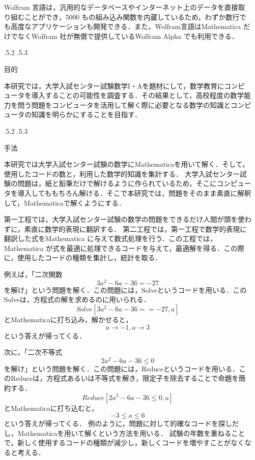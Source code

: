 \documentclass[uplatex,twocolumn]{jsarticle}
\makeatletter
\renewcommand{\section}{%
    \if@slide\clearpage\fi
    \@startsection{section}{1}{\z@}%
    {\Cvs \@plus.5\Cdp \@minus.2\Cdp}%
    {.5\Cvs \@plus.3\Cdp}%
    {\normalfont\raggedright}}
\makeatother
\begin{document}
Wolfram 言語は，汎用的なデータベースやインターネット上のデータを直接取り組むことができ，5000 もの組み込み関数を内蔵しているため，わずか数行でも高度なアプリケーションも開発できる．また，Wolfram言語はMathematica だけでなくWolfram 社が無償で提供しているWolfram Alpha でも利用できる\cite{mitubisi}．



\section{目的}

本研究では，大学入試センター試験数学I・Aを題材にして，数学教育にコンピュータを導入することの可能性を調査する．その結果として，高校程度の数学能力を問う問題をコンピュータを活用して解く際に必要となる数学の知識とコンピュータの知識を明らかにすることを目指す．





\section{手法}


 
本研究では大学入試センター試験の数学にMathematicaを用いて解く．そして，使用したコードの数と，利用した数学的知識を集計する．
大学入試センター試験の問題は，紙と鉛筆だけで解けるように作られているため，そこにコンピュータを導入してももちろん解ける．そこで本研究では，問題をそのまま素直に解釈して，Mathematicaで解くようにする．

第一工程では，大学入試センター試験の数学の問題をできるだけ人間が頭を使わずに，素直に数学的表現に翻訳する．
第二工程では，第一工程で数学的表現に翻訳した式をMathematica に与えて数式処理を行う．この工程では，Mathematica が式を最適に処理できるコードを与えて，最適解を得る．この際に，使用したコードの種類を集計し，統計を取る．

例えば，「二次関数\[3a^2 -6a-36=-27\]を解け」という問題を解く．この問題には，Solveというコードを用いる．このSolveは，方程式の解を求めるのに用いられる．\[Solve[3a^2 -6a-36==-27,a]\]とMathematicaに打ち込み，解かせると，\[{{a \rightarrow -1},{a \rightarrow 3}}\]という答えが帰ってくる．

次に，「二次不等式\[2a^2 -6a-36 \le 0\]を解け」という問題を解く．この問題には，Reduceというコードを用いる．このReduceは，方程式あるいは不等式を解き，限定子を除去することで命題を簡約する．\[Reduce[2a^2 -6a-36 \le 0,a]\]とMathematicaに打ち込むと，\[-3 \le a \le 6\]という答えが帰ってくる．
例のように，問題に対して的確なコードを探しだし，Mathematicaを用いて解くという方法を用いる．
試験の年数を重ねることで，新しく使用するコードの種類が減少し，新しくコードを増やすことがなくなると考える．
\end{document}
